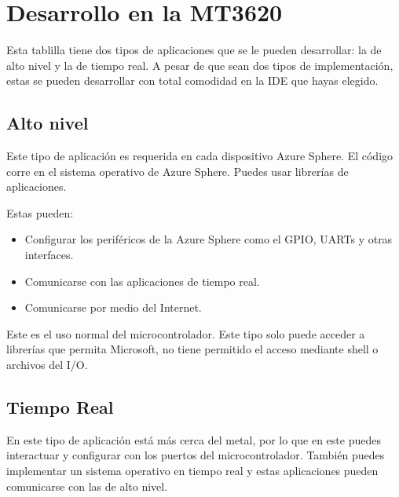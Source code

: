 \section{Desarrollo en la MT3620}
Esta tablilla tiene dos tipos de aplicaciones que se le pueden desarrollar: la de alto nivel y la de tiempo real. A pesar de que sean dos tipos de implementación, estas se pueden desarrollar con total comodidad en la IDE que hayas elegido.


\subsection{Alto nivel}
Este tipo de aplicación es requerida en cada dispositivo Azure Sphere. El código corre en el sistema operativo de Azure Sphere. Puedes usar librerías de aplicaciones.

Estas pueden:
\begin{itemize}
	\item
	Configurar los periféricos de la Azure Sphere como el GPIO, UARTs y otras interfaces.
	\item 
	Comunicarse con las aplicaciones de tiempo real.
	\item 
	Comunicarse por medio del Internet.
\end{itemize}

Este es el uso normal del microcontrolador. Este tipo solo puede acceder a librerías que permita Microsoft, no tiene permitido el acceso mediante shell o archivos del I/O.

\subsection{Tiempo Real}
En este tipo de aplicación está más cerca del metal, por lo que en este puedes interactuar y configurar con los puertos del microcontrolador. También puedes implementar un sistema operativo en tiempo real y estas aplicaciones pueden comunicarse con las de alto nivel.

